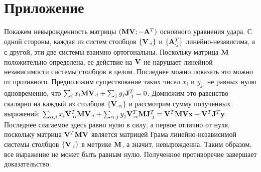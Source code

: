 \section{Приложение}

Покажем невырожденность матрицы $(\mathbf{M}\mathbf{V}; -\mathbf{A}^T)$ основного уравнения удара.
С одной стороны, каждая из систем столбцов $\{\mathbf{V}_{\cdot i}\}$ и $\{\mathbf{A}^T_{\cdot j}\}$ линейно-независима,
а с другой, эти две системы взаимно ортогональны.
Поскольку матрица $\mathbf{M}$ положительно определена, ее действие на $\mathbf{V}$ не нарушает линейной независимости системы столбцов в целом.
Последнее можно показать это можно от противного.
Предположим существование таких чисел $x_i$ и $y_j$, не равных нулю одновременно, что $\sum_i x_i \mathbf{M} \mathbf{V}_{\cdot i} + \sum_j y_j \mathbf{J}^T_{\cdot j} = 0$.
Домножим это равенство скалярно на каждый из столбцов $\{\mathbf{V}_{\cdot \alpha}\}$ и рассмотрим сумму полученных выражений: $\sum_{\alpha, i} x_i \mathbf{V}_{\cdot \alpha}^T \mathbf{M} \mathbf{V}_{\cdot i} + \sum_{\alpha, j} y_j \mathbf{V}_{\cdot \alpha}^T \mathbf{M} \mathbf{J}^T_{\cdot j} = \mathbf{V}^T \mathbf{M} \mathbf{V} \mathbf{x} + \mathbf{V}^T\mathbf{J}^T\mathbf{y}$.
Последнее слагаемое здесь равно нулю в силу,
а первое отлично от нуля, поскольку матрица $\mathbf{V}^T \mathbf{M} \mathbf{V}$ является матрицей Грама линейно-независимой системы столбцов $\{\mathbf{V}_{\cdot i}\}$ в метрике $\mathbf{M}$, а значит, невырожденна.
Таким образом, все выражение не может быть равным нулю.
Полученное противоречие завершает доказательство.